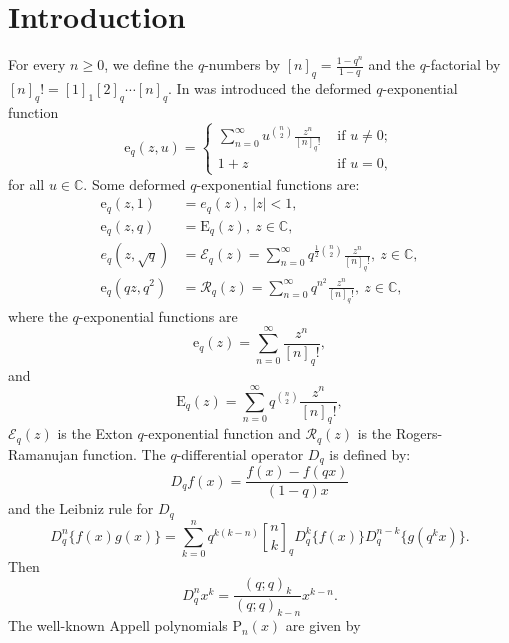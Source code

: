 \documentclass[12pt]{article}
\newcommand{\qbinom}{\genfrac{[}{]}{0pt}{}}
\newcommand{\C}{\mathbb{C}}
\newcommand{\e}{\mathrm{e}}
\newcommand{\p}{\mathrm{P}}
\newcommand{\E}{\mathrm{E}}
\begin{document}
\section{Introduction}
For every $n\geq0$, we define the $q$-numbers by $[n]_{q}=\frac{1-q^n}{1-q}$ and the $q$-factorial by $[n]_{q}!=[1]_{1}[2]_{q}\cdots[n]_{q}$. In \cite{orozco} was introduced the deformed $q$-exponential function
\begin{equation}\label{eqn_dqexp}
    \e_{q}(z,u)=
    \begin{cases}
        \sum_{n=0}^{\infty}u^{\binom{n}{2}}\frac{z^{n}}{[n]_{q}!}&\text{ if }u\neq0;\\
        1+z&\text{ if }u=0,
    \end{cases}
\end{equation}
for all $u\in\C$. Some deformed $q$-exponential functions are:
\begin{align*}
    \e_{q}(z,1)&=e_{q}(z),\ \vert z\vert<1,\\
    \e_{q}(z,q)&=\E_{q}(z),\ z\in\C,\\
    e_{q}(z,\sqrt{q})&=\mathcal{E}_{q}(z)=\sum_{n=0}^{\infty}q^{\frac{1}{2}\binom{n}{2}}\frac{z^n}{[n]_{q}!},\ z\in\C,\\
    \e_{q}(qz,q^2)&=\mathcal{R}_{q}(z)=\sum_{n=0}^{\infty}q^{n^2}\frac{z^n}{[n]_{q}!},\ z\in\C,
\end{align*}
where the $q$-exponential functions are
\begin{equation*}
    \e_{q}(z)=\sum_{n=0}^{\infty}\frac{z^n}{[n]_{q}!},
\end{equation*}
and
\begin{equation*}
    \E_{q}(z)=\sum_{n=0}^{\infty}q^{\binom{n}{2}}\frac{z^n}{[n]_{q}!},
\end{equation*}
$\mathcal{E}_{q}(z)$ is the Exton $q$-exponential function and  $\mathcal{R}_{q}(z)$ is the Rogers-Ramanujan function. The $q$-differential operator $D_{q}$ is defined by:
\begin{equation*}
    D_{q}f(x)=\frac{f(x)-f(qx)}{(1-q)x}
\end{equation*}
and the Leibniz rule for $D_{q}$
\begin{equation}\label{eqn_leibniz}
    D_{q}^{n}\{f(x)g(x)\}=\sum_{k=0}^{n}q^{k(k-n)}\qbinom{n}{k}_{q}D_{q}^{k}\{f(x)\}D_{q}^{n-k}\{g(q^{k}x)\}.
\end{equation}
Then
\begin{equation*}
    D_{q}^nx^{k}=\frac{(q;q)_{k}}{(q;q)_{k-n}}x^{k-n}.
\end{equation*}
The well-known Appell polynomials \cite{appell} $\p_{n}(x)$ are given by
\end{document}
